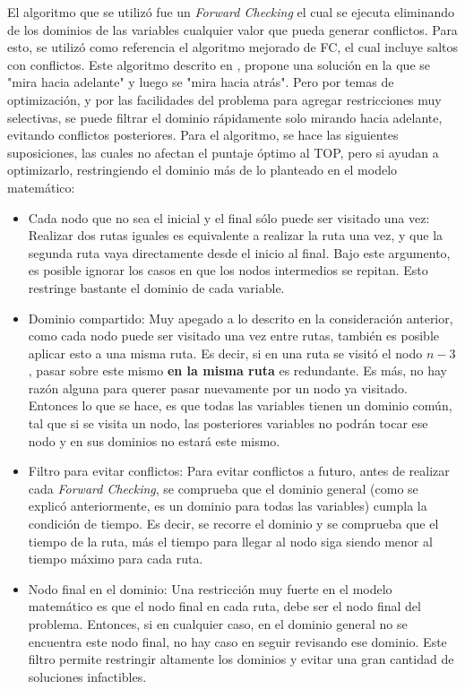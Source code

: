 \documentclass[letter, 10pt]{article}
\begin{document}
El algoritmo que se utilizó fue un \textit{Forward Checking} el cual se ejecuta eliminando de los dominios de las variables cualquier valor que pueda generar conflictos. Para esto, se utilizó como referencia el algoritmo mejorado de FC, el cual incluye saltos con conflictos. Este algoritmo descrito en \cite{CBJ}, propone una solución en la que se "mira hacia adelante" y luego se "mira hacia atrás". Pero por temas de optimización, y por las facilidades del problema para agregar restricciones muy selectivas, se puede filtrar el dominio rápidamente solo mirando hacia adelante, evitando conflictos posteriores. Para el algoritmo, se hace las siguientes suposiciones, las cuales no afectan el puntaje óptimo al TOP, pero si ayudan a optimizarlo, restringiendo el dominio más de lo planteado en el modelo matemático:
\begin{itemize}
    \item Cada nodo que no sea el inicial y el final sólo puede ser visitado una vez: Realizar dos rutas iguales es equivalente a realizar la ruta una vez, y que la segunda ruta vaya directamente desde el inicio al final. Bajo este argumento, es posible ignorar los casos en que los nodos intermedios se repitan. Esto restringe bastante el dominio de cada variable. 
    \item Dominio compartido: Muy apegado a lo descrito en la consideración anterior, como cada nodo puede ser visitado una vez entre rutas, también es posible aplicar esto a una misma ruta. Es decir, si en una ruta se visitó el nodo $n-3$, pasar sobre este mismo \textbf{en la misma ruta} es redundante. Es más, no hay razón alguna para querer pasar nuevamente por un nodo ya visitado. Entonces lo que se hace, es que todas las variables tienen un dominio común, tal que si se visita un nodo, las posteriores variables no podrán tocar ese nodo y en sus dominios no estará este mismo. 
    
    \item Filtro para evitar conflictos: Para evitar conflictos a futuro, antes de realizar cada \textit{Forward Checking}, se comprueba que el dominio general (como se explicó anteriormente, es un dominio para todas las variables) cumpla la condición de tiempo. Es decir, se recorre el dominio y se comprueba que el tiempo de la ruta, más el tiempo para llegar al nodo siga siendo menor al tiempo máximo para cada ruta. 
    
    \item Nodo final en el dominio: Una restricción muy fuerte en el modelo matemático es que el nodo final en cada ruta, debe ser el nodo final del problema. Entonces, si en cualquier caso, en el dominio general no se encuentra este nodo final, no hay caso en seguir revisando ese dominio. Este filtro permite restringir altamente los dominios y evitar una gran cantidad de soluciones infactibles. 
\end{itemize}
\end{document}

